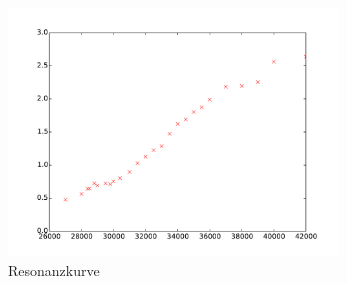 \begin{figure}
  \centering
  \includegraphics[width=0.78\textwidth]{linphasenverschiebung.pdf}
  \caption{Resonanzkurve}
  \label{fig:linphasenverschiebung}
\end{figure}
